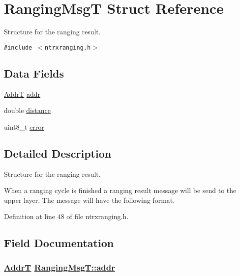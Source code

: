 \hypertarget{structRangingMsgT}{
\section{Ranging\-Msg\-T Struct Reference}
\label{structRangingMsgT}
}
Structure for the ranging result.  


{\tt \#include $<$ntrxranging.h$>$}

\subsection*{Data Fields}
\begin{CompactItemize}
\item 
\hyperlink{ntrxtypes_8h_9763ea343e88d0129a49347a4b2ff676}{Addr\-T} \hyperlink{structRangingMsgT_b01dfcfbabc08a375ec34b2a79ce2f0c}{addr}
\item 
double \hyperlink{structRangingMsgT_b10eb73f4f5092f27dd38215cc59a748}{distance}
\item 
uint8\_\-t \hyperlink{structRangingMsgT_a90c066386e8e1ac2a4a08f88c958d68}{error}
\end{CompactItemize}


\subsection{Detailed Description}
Structure for the ranging result. 

When a ranging cycle is finished a ranging result message will be send to the upper layer. The message will have the following format. 



Definition at line 48 of file ntrxranging.h.

\subsection{Field Documentation}
\hypertarget{structRangingMsgT_b01dfcfbabc08a375ec34b2a79ce2f0c}{
\subsubsection[addr]{\setlength{\rightskip}{0pt plus 5cm}\hyperlink{ntrxtypes_8h_9763ea343e88d0129a49347a4b2ff676}{Addr\-T} \hyperlink{structRangingMsgT_b01dfcfbabc08a375ec34b2a79ce2f0c}{Ranging\-Msg\-T::addr}}}
\label{structRangingMsgT_b01dfcfbabc08a375ec34b2a79ce2f0c}


